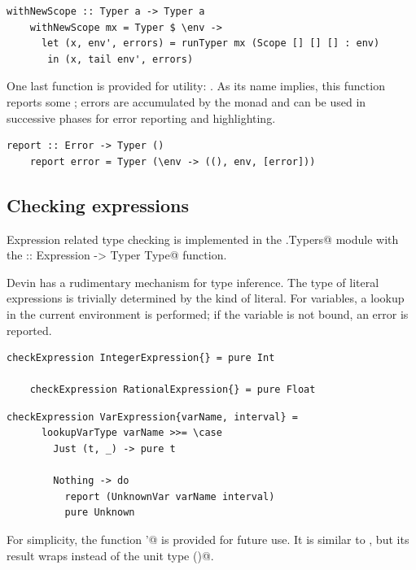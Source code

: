 \documentclass[UdineBachThesis,american,11pt]{PhdThesis}
\begin{document}
  \begin{lstlisting}[gobble=4,basicstyle=\ttfamily\small]
    withNewScope :: Typer a -> Typer a
    withNewScope mx = Typer $ \env ->
      let (x, env', errors) = runTyper mx (Scope [] [] [] : env)
       in (x, tail env', errors)
  \end{lstlisting}

  One last function is provided for utility: \lstinline@report@. As its name
  implies, this function reports some \lstinline@Error@; errors are accumulated
  by the \lstinline@Typer@ monad and can be used in successive phases for error
  reporting and highlighting.

  \begin{lstlisting}[gobble=4,basicstyle=\ttfamily\small]
    report :: Error -> Typer ()
    report error = Typer (\env -> ((), env, [error]))
  \end{lstlisting}

  \subsection{Checking expressions}

  Expression related type checking is implemented in the
  \lstinline@Devin.Typers@ module with the
  \lstinline@checkExpression :: Expression -> Typer Type@ function.

  Devin has a rudimentary mechanism for type inference. The type of literal
  expressions is trivially determined by the kind of literal. For variables, a
  lookup in the current environment is performed; if the variable is not bound,
  an error is reported.

  \begin{lstlisting}[gobble=4,basicstyle=\ttfamily\small]
    checkExpression IntegerExpression{} = pure Int

    checkExpression RationalExpression{} = pure Float
  \end{lstlisting}

  \pagebreak

  \begin{lstlisting}[gobble=4,basicstyle=\ttfamily\small]
    checkExpression VarExpression{varName, interval} =
      lookupVarType varName >>= \case
        Just (t, _) -> pure t

        Nothing -> do
          report (UnknownVar varName interval)
          pure Unknown
  \end{lstlisting}

  For simplicity, the function \lstinline@report'@ is provided for future use.
  It is similar to \lstinline@report@, but its result wraps
  \lstinline@Unknown@ instead of the unit type \lstinline@()@.
\end{document}
